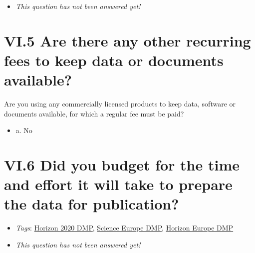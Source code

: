 \documentclass[a4paper,12pt]{report}
\begin{document}
\begin{itemize}
  \item[\XSolidBrush] \textit{This question has not been answered yet!}
\end{itemize}
  


\section*{\protect\textcolor{colorSecId}{VI.5} Are there any other recurring fees to keep data or documents available?}

\label{d5b27482-b598-4b8c-b534-417d4ad27394.4baf405e-262e-4f1a-bfdc-fe72fc628650}




\noindent
\begin{markdown}
Are you using any commercially licensed products to keep data, software or documents available, for which a regular fee must be paid?
\end{markdown}



\begin{itemize}
  \item[\CheckmarkBold] a. No
\end{itemize}






\section*{\protect\textcolor{colorSecId}{VI.6} Did you budget for the time and effort it will take to prepare the data for publication?}

\label{d5b27482-b598-4b8c-b534-417d4ad27394.13a7eeae-09f5-42bf-8e62-b2c1fe1b86f7}


\begin{itemize}
  \item \textit{Tags}: \ul{Horizon 2020 DMP}, \ul{Science Europe DMP}, \ul{Horizon Europe DMP}
  \end{itemize}




\begin{itemize}
  \item[\XSolidBrush] \textit{This question has not been answered yet!}
\end{itemize}
  
\end{document}
